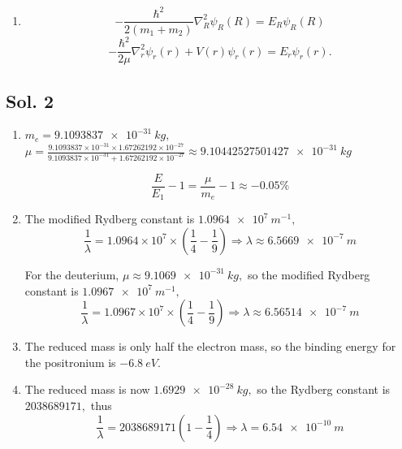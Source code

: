 \begin{enumerate}
    \begin{align*}
        -\frac{\hbar^2}{2m_1}
        (\frac{\mu}{m_2}\nabla_R +\nabla_r)^2\psi
        -\frac{\hbar^2}{2m_2}
        (\frac{\mu}{m_1}\nabla_R -\nabla_r)^2\psi
        +V(r)\psi = E\psi
    \end{align*}
    \begin{align*}
        (-\frac{\hbar^2\mu^2}{2m_1m_2^2}
        -\frac{\hbar^2\mu^2}{2m_2m_1^2})
        \nabla^2_R
        \psi 
        +
        (-\frac{\hbar^2}{2m_1}
        -\frac{\hbar^2}{2m_2})
        \nabla_r^2 \psi 
        +V(r)\psi = E\psi.
    \end{align*}
    \begin{align*}
        -\frac{\hbar^2}{2(m_1+m_2)}
        \nabla^2_R\psi 
        -
        \frac{\hbar^2}{2\mu}
        \nabla_r^2\psi + V(r)\psi = E\psi.
    \end{align*}
    \item 
    $$
    -\frac{\hbar^2}{2(m_1+m_2)}
        \nabla^2_R\psi_R(R) = E_R\psi_R(R)
    $$
    $$
    -\frac{\hbar^2}{2\mu}
        \nabla_r^2\psi_r(r) + V(r)\psi_r(r) = E_r\psi_r(r).
    $$
\end{enumerate}

\subsection*{Sol. 2}
\begin{enumerate}
    \item 
    $m_e=\qty{9.1093837e-31}{kg},$
$\mu = \frac{9.1093837\times 10^{-31}\times 1.67262192\times 10^{-27}}
{9.1093837\times 10^{-31}+1.67262192\times 10^{-27}}
\approx \qty{9.10442527501427e-31}{kg}
$

$$
\frac{E}{E_1}-1 = 
\frac{\mu}{m_e} - 1
\approx -0.05\%
$$
\item 
The modified Rydberg constant is 
$\qty{1.0964e7}{m^{-1}},$ 
$$
\frac{1}{\lambda}=
1.0964\times10^7\times(\frac{1}{4}-\frac{1}{9})
\Rightarrow \lambda\approx \qty{6.5669e-7}{m}
$$

For the deuterium, $\mu\approx \qty{9.1069e-31}{kg},$ so the 
modified Rydberg constant is  $\qty{1.0967e7}{m^{-1}},$
$$
\frac{1}{\lambda}=
1.0967\times10^7\times(\frac{1}{4}-\frac{1}{9})
\Rightarrow \lambda\approx \qty{6.56514e-7}{m}
$$

\item 
The reduced mass is only half the electron mass, so 
the binding energy for the positronium is $-\qty{6.8}{eV}.$
\item The reduced mass is now $\qty{1.6929e-28}{kg},$ so 
the Rydberg constant is $2038689171,$ thus 
$$
\frac{1}{\lambda} = 2038689171(1-\frac{1}{4})
\Rightarrow \lambda =  \qty{6.54e-10}{m}
$$


\end{enumerate}


